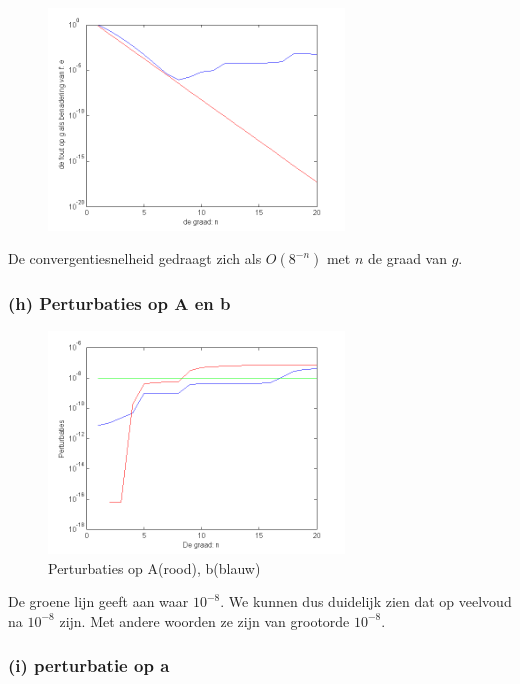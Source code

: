 \documentclass[11pt,a4paper]{article}
\begin{document}
\begin{figure}[H]
	\centering
	\includegraphics[width=0.7\textwidth]{22f1.png}
	\caption*{}
	\end{figure}
	
De convergentiesnelheid gedraagt zich als $O(8^{-n})$ met $n$ de graad van $g$.

\subsubsection*{(h) Perturbaties op A en b}

\begin{figure}[H]
	\centering
	\includegraphics[width=0.7\textwidth]{22h1.png}
	\caption*{Perturbaties op A(rood), b(blauw)}
	\end{figure}

De groene lijn geeft aan waar $10^{-8}$. We kunnen dus duidelijk zien dat op veelvoud na $10^{-8}$ zijn. Met andere woorden ze zijn van grootorde $10^{-8}$.

\subsubsection*{(i) perturbatie op a}
\end{document}

